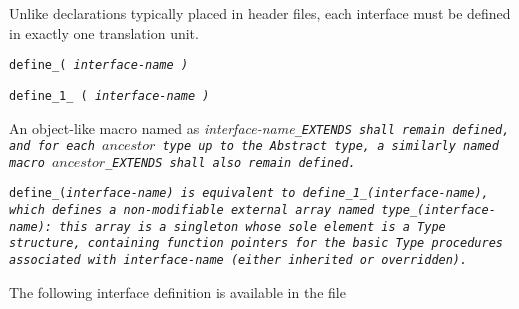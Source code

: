 Unlike declarations typically placed in header files,
each interface must be defined in exactly one translation unit.


\tt{define_}\s\s\s\tt{(} \it{interface-name} \tt{)}

\tt{define_1_ (} \it{interface-name} \tt{)}


An object-like macro named as \it{interface-name}\tt{_EXTENDS} shall
remain defined, and for each $ancestor$ type up to the \tt{Abstract} type,
a similarly named macro $ancestor$\tt{_EXTENDS} shall also remain defined.


\tt{define_(}\it{interface-name}\tt{)} is equivalent to
\tt{define_1_(}\it{interface-name}\tt{)}, which defines a non-modifiable
external array named \tt{type_(}\it{interface-name}\tt{)}:
this array is a singleton whose sole element is a \tt{Type} structure,
containing function pointers for the basic \tt{Type} procedures
associated with \it{interface-name} (either inherited or overridden).

\example The following interface definition is available in the file
